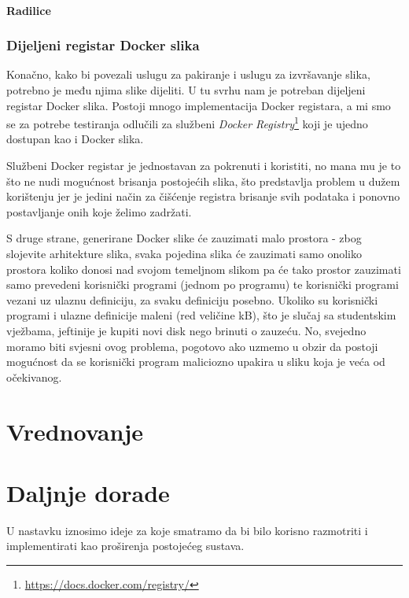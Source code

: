 \documentclass[times, utf8, zavrsni]{fer}
\begin{document}
{\subsubsection{Radilice}

\subsection{Dijeljeni registar Docker slika}

Konačno, kako bi povezali uslugu za pakiranje i uslugu za izvršavanje slika, potrebno je među njima slike dijeliti. U tu svrhu nam je potreban dijeljeni registar Docker slika. Postoji mnogo implementacija Docker registara, a mi smo se za potrebe testiranja odlučili za službeni {\textit{Docker Registry}}{\footnote{\url{https://docs.docker.com/registry/}}} koji je ujedno dostupan kao i Docker slika.

Službeni Docker registar je jednostavan za pokrenuti i koristiti, no mana mu je to što ne nudi mogućnost brisanja postojećih slika, što predstavlja problem u dužem korištenju jer je jedini način za čišćenje registra brisanje svih podataka i ponovno postavljanje onih koje želimo zadržati.

S druge strane, generirane Docker slike će zauzimati malo prostora - zbog slojevite arhitekture slika, svaka pojedina slika će zauzimati samo onoliko prostora koliko donosi nad svojom temeljnom slikom pa će tako prostor zauzimati samo prevedeni korisnički programi (jednom po programu) te korisnički programi vezani uz ulaznu definiciju, za svaku definiciju posebno. Ukoliko su korisnički programi i ulazne definicije maleni (red veličine kB), što je slučaj sa studentskim vježbama, jeftinije je kupiti novi disk nego brinuti o zauzeću. No, svejedno moramo biti svjesni ovog problema, pogotovo ako uzmemo u obzir da postoji mogućnost da se korisnički program maliciozno upakira u sliku koja je veća od očekivanog.

\chapter{Vrednovanje}

\chapter{Daljnje dorade}

U nastavku iznosimo ideje za koje smatramo da bi bilo korisno razmotriti i implementirati kao proširenja postojećeg sustava.

}
\end{document}
